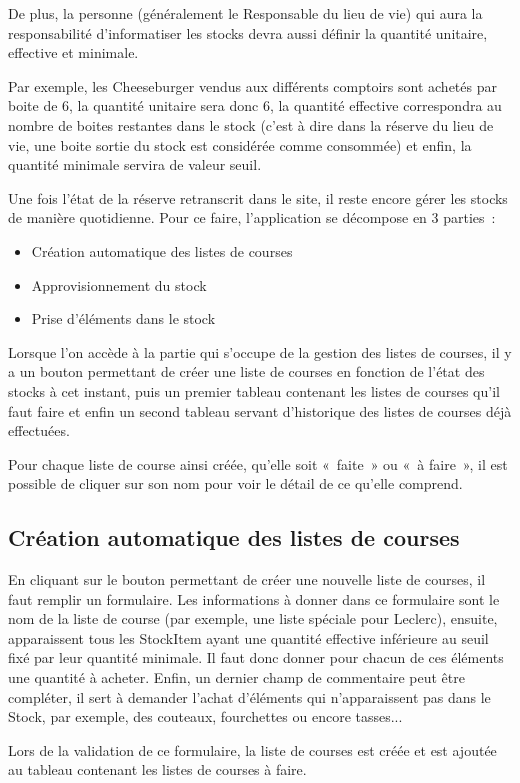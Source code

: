 \documentclass[a4paper]{report}
\begin{document}
\par De plus, la personne (généralement le Responsable du lieu de vie) qui aura la responsabilité d’informatiser les
stocks devra aussi définir la quantité unitaire, effective et minimale.
\par Par exemple, les Cheeseburger vendus aux différents comptoirs sont achetés par boite de 6, la quantité unitaire
sera donc 6, la quantité effective correspondra au nombre de boites restantes dans le stock (c’est à dire dans la
réserve du lieu de vie, une boite sortie du stock est considérée comme consommée) et enfin, la quantité minimale servira
de valeur seuil.
\par Une fois l’état de la réserve retranscrit dans le site, il reste encore gérer les stocks de manière quotidienne.
Pour ce faire, l’application se décompose en 3 parties :
\begin{itemize}
    \item Création automatique des listes de courses
    \item Approvisionnement du stock
    \item Prise d’éléments dans le stock
\end{itemize}

\par Lorsque l’on accède à la partie qui s’occupe de la gestion des listes de courses, il y a un bouton permettant de
créer une liste de courses en fonction de l’état des stocks à cet instant, puis un premier tableau contenant les listes
de courses qu’il faut faire et enfin un second tableau servant d’historique des listes de courses déjà effectuées.
\par Pour chaque liste de course ainsi créée, qu’elle soit « faite » ou « à faire », il est possible de cliquer sur son
nom pour voir le détail de ce qu’elle comprend.

\subsection{Création automatique des listes de courses}
\par En cliquant sur le bouton permettant de créer une nouvelle liste de courses, il faut remplir un formulaire. Les
informations à donner dans ce formulaire sont le nom de la liste de course (par exemple, une liste spéciale pour
Leclerc), ensuite, apparaissent tous les StockItem ayant une quantité effective inférieure au seuil fixé par leur
quantité minimale. Il faut donc donner pour chacun de ces éléments une quantité à acheter. Enfin, un dernier champ de
commentaire peut être compléter, il sert à demander l’achat d’éléments qui n’apparaissent pas dans le Stock, par
exemple, des couteaux, fourchettes ou encore tasses...
\par Lors de la validation de ce formulaire, la liste de courses est créée et est ajoutée au tableau contenant les
listes de courses à faire.
\end{document}
